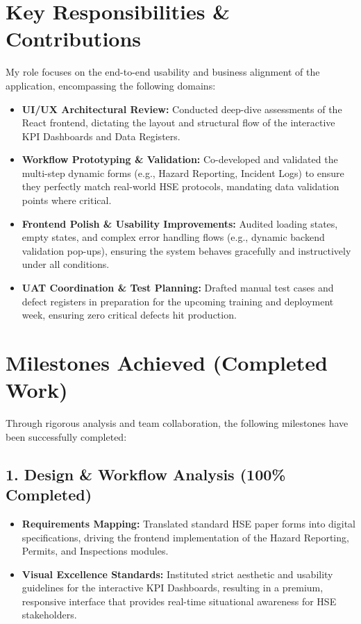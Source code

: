 \documentclass[12pt, a4paper]{article}
\begin{document}
\section{Key Responsibilities \& Contributions}
My role focuses on the end-to-end usability and business alignment of the application, encompassing the following domains:
\begin{itemize}[leftmargin=*, label=\textcolor{primary}{$\bullet$}]
    \item \textbf{UI/UX Architectural Review:} Conducted deep-dive assessments of the React frontend, dictating the layout and structural flow of the interactive KPI Dashboards and Data Registers.
    \item \textbf{Workflow Prototyping \& Validation:} Co-developed and validated the multi-step dynamic forms (e.g., Hazard Reporting, Incident Logs) to ensure they perfectly match real-world HSE protocols, mandating data validation points where critical.
    \item \textbf{Frontend Polish \& Usability Improvements:} Audited loading states, empty states, and complex error handling flows (e.g., dynamic backend validation pop-ups), ensuring the system behaves gracefully and instructively under all conditions.
    \item \textbf{UAT Coordination \& Test Planning:} Drafted manual test cases and defect registers in preparation for the upcoming training and deployment week, ensuring zero critical defects hit production.
\end{itemize}

\section{Milestones Achieved (Completed Work)}
Through rigorous analysis and team collaboration, the following milestones have been successfully completed:

\subsection{1. Design \& Workflow Analysis (100\% Completed)}
\begin{itemize}[leftmargin=*, label=$\circ$]
    \item \textbf{Requirements Mapping:} Translated standard HSE paper forms into digital specifications, driving the frontend implementation of the Hazard Reporting, Permits, and Inspections modules.
    \item \textbf{Visual Excellence Standards:} Instituted strict aesthetic and usability guidelines for the interactive KPI Dashboards, resulting in a premium, responsive interface that provides real-time situational awareness for HSE stakeholders.
\end{itemize}
\end{document}
